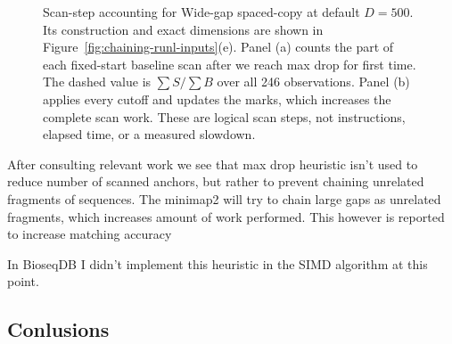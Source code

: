 \begin{figure}[H]
\caption{Scan-step accounting for Wide-gap spaced-copy at default \(D=500\).
Its construction and exact dimensions are shown in
Figure~\ref{fig:chaining-runl-inputs}(e). Panel (a) counts the part of each
fixed-start baseline scan after we reach max drop for first time.  The dashed value is \(\sum S/\sum B\) over all 246
observations.  Panel (b) applies every cutoff and updates the marks, which
increases the complete scan work.  These are logical scan steps, not
instructions, elapsed time, or a measured slowdown.}
\label{fig:chaining-max-drop-long-chain-accounting}
\end{figure}

After consulting relevant work we see that max drop heuristic isn't used to reduce number of scanned anchors, but rather to prevent chaining unrelated fragments of sequences.
The minimap2 will try to chain large gaps as unrelated fragments, which increases amount of work performed. This however is reported to increase matching accuracy~\cite{minimap2_why_max_drop}

In BioseqDB I didn't implement this heuristic in the SIMD algorithm at this point.

\subsection{Conlusions}

